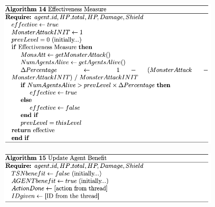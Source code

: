 \begin{figure}[htb]
    \centering
    \includegraphics[scale=0.7]{006_team_3_agent_design/FIGS/Algo14.png}
    \label{fig:algo14}
\end{figure}



\begin{figure}[htb]
    \centering
    \includegraphics[scale=0.7]{006_team_3_agent_design/FIGS/Algo15.png}
    \label{fig:algo15}
\end{figure}

